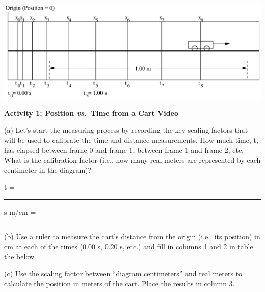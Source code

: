 \vspace{0.3cm}
{\par\centering \includegraphics[trim={0.2cm 0 0.2cm 0},clip]{equations/equations_fig1.eps} \par}
\vspace{0.3cm}

\pagebreak[2]
\textbf{Activity 1: Position \textit{vs.}~Time from a Cart Video} 

(a) Let's start the measuring process by recording the key scaling factors that
will be used to calibrate the time and distance measurements. How much time,
t, has elapsed between frame 0 and frame 1, between frame 1 and frame 2, etc.
What is the calibration factor (i.e., how many real meters are represented by
each centimeter in the diagram)?

t =   \rule{1.0in}{0.1pt} s \hfill{}m/cm = \rule{1.0in}{0.1pt}

(b) Use a ruler to measure the cart's distance from the origin (i.e., its position)
in cm at each of the times (0.00 s, 0.20 s, etc.) and fill in columns 1 and
2 in table the below.

(c) Use the scaling factor between ``diagram centimeters'' and
real meters to calculate the position in meters of the cart. Place the results
in column 3.

